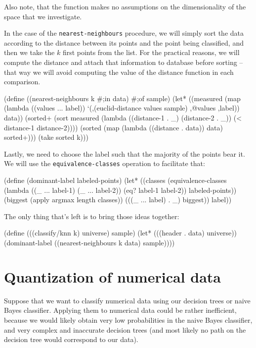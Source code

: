 Also note, that the function makes no assumptions on the
dimensionality of the space that we investigate.

In the case of the \texttt{nearest-neighbours} procedure,
we will simply sort the data according to the distance between
its points and the point being classified, and then we take
the $k$ first points from the list. For the practical reasons,
we will compute the distance and attach that information to
database before sorting -- that way we will avoid computing
the value of the distance function in each comparison.

\begin{Snippet}
(define ((nearest-neighbours k #;in data) #;of sample)
  (let* ((measured (map (lambda ((values ... label))
			  `(,(euclid-distance values sample) 
			    ,@values ,label))
			data))
	 (sorted+ (sort measured
			(lambda ((distance-1 . _) (distance-2 . _))
			  (< distance-1 distance-2))))
	 (sorted (map (lambda ((distance . data)) data) sorted+)))
    (take sorted k)))
\end{Snippet}

Lastly, we need to choose the label such that the majority
of the points bear it. We will use the \texttt{equivalence-classes}
operation to facilitate that:

\begin{Snippet}
(define (dominant-label labeled-points)
  (let* ((classes (equivalence-classes
                   (lambda ((_ ... label-1) (_ ... label-2))
                     (eq? label-1 label-2))
                   labeled-points))
         (biggest (apply argmax length classes))
         (((_ ... label) . _) biggest))
    label))
\end{Snippet}

The only thing that's left is to bring those ideas together:

\begin{Snippet}
(define (((classify/knn k) universe) sample)
  (let* (((header . data) universe))
    (dominant-label ((nearest-neighbours k data) sample))))
\end{Snippet}

\section{Quantization of numerical data}

Suppose that we want to classify numerical data using
our decision trees or naive Bayes classifier. Applying them
to numerical data could be rather inefficient, because we
would likely obtain very low probabilities in the naive
Bayes classifier, and very complex and inaccurate decision
trees (and most likely no path on the decision tree would
correspond to our data).

